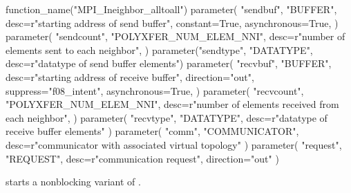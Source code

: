 \begin{mpi-binding}
    function_name("MPI_Ineighbor_alltoall")
    parameter(
        "sendbuf",
        "BUFFER",
        desc=r"starting address of send buffer",
        constant=True,
        asynchronous=True,
    )
    parameter(
        "sendcount",
        "POLYXFER_NUM_ELEM_NNI",
        desc=r"number of elements sent to each neighbor",
    )
    parameter("sendtype", "DATATYPE", desc=r"datatype of send buffer elements")
    parameter(
        "recvbuf",
        "BUFFER",
        desc=r"starting address of receive buffer",
        direction="out",
        suppress="f08_intent",
        asynchronous=True,
    )
    parameter(
        "recvcount",
        "POLYXFER_NUM_ELEM_NNI",
        desc=r"number of elements received from each neighbor",
    )
    parameter(
        "recvtype", "DATATYPE", desc=r"datatype of receive buffer elements"
    )
    parameter(
        "comm", "COMMUNICATOR", desc=r"communicator with associated virtual topology"
    )
    parameter(
        "request", "REQUEST", desc=r"communication request", direction="out"
    )
\end{mpi-binding}

 starts a nonblocking variant of
.


